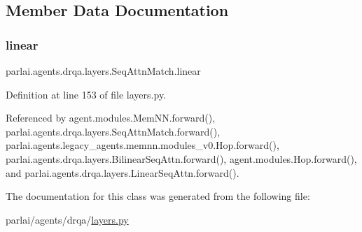 \subsection{Member Data Documentation}
\mbox{\label{classparlai_1_1agents_1_1drqa_1_1layers_1_1SeqAttnMatch_a6332862a9596fe3e4cb3c323b818a42f}} 
\subsubsection{\texorpdfstring{linear}{linear}}
{\footnotesize\ttfamily parlai.\+agents.\+drqa.\+layers.\+Seq\+Attn\+Match.\+linear}



Definition at line 153 of file layers.\+py.



Referenced by agent.\+modules.\+Mem\+N\+N.\+forward(), parlai.\+agents.\+drqa.\+layers.\+Seq\+Attn\+Match.\+forward(), parlai.\+agents.\+legacy\+\_\+agents.\+memnn.\+modules\+\_\+v0.\+Hop.\+forward(), parlai.\+agents.\+drqa.\+layers.\+Bilinear\+Seq\+Attn.\+forward(), agent.\+modules.\+Hop.\+forward(), and parlai.\+agents.\+drqa.\+layers.\+Linear\+Seq\+Attn.\+forward().



The documentation for this class was generated from the following file\+:\begin{DoxyCompactItemize}
\item 
parlai/agents/drqa/\hyperlink{layers_8py}{layers.\+py}\end{DoxyCompactItemize}
